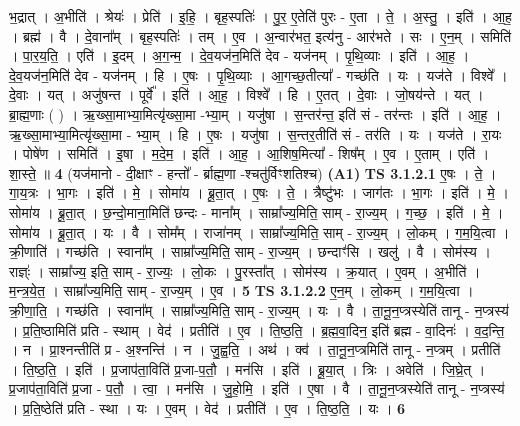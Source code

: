 \documentclass[17pt]{extarticle}
\begin{document}
                  भ॒द्रात् । अ॒भीति॑ । श्रेयः॑ । प्रेति॑ । इ॒हि॒ । बृह॒स्पतिः॑ । पु॒र॒ ए॒तेति॑ पुरः - ए॒ता । ते॒ । अ॒स्तु॒ । इति॑ । आ॒ह॒ । ब्रह्म॑ । वै । दे॒वाना᳚म् । बृह॒स्पतिः॑ । तम् । ए॒व । अ॒न्वार॑भत॒ इत्य॑नु - आर॑भते । सः । ए॒न॒म् । समिति॑ । पा॒र॒य॒ति॒ । एति॑ । इ॒दम् । अ॒ग॒न्म॒ । दे॒व॒यज॑न॒मिति॑ देव - यज॑नम् । पृ॒थि॒व्याः । इति॑ । आ॒ह॒ । दे॒व॒यज॑न॒मिति॑ देव - यज॑नम् । हि । ए॒षः । पृ॒थि॒व्याः । आ॒गच्छ॒तीत्या᳚ - गच्छ॑ति । यः । यज॑ते । विश्वे᳚ । दे॒वाः । यत् । अजु॑षन्त । पूर्वे᳚ । इति॑ । आ॒ह॒ । विश्वे᳚ । हि । ए॒तत् । दे॒वाः । जो॒षय॑न्ते । यत् । ब्रा॒ह्म॒णाः ( ) । ऋ॒ख्सा॒माभ्या॒मित्यृ॑ख्सा॒मा -भ्या॒म् । यजु॑षा । स॒न्तर॑न्त॒ इति॑ सं - तर॑न्तः । इति॑ । आ॒ह॒ । ऋ॒ख्सा॒माभ्या॒मित्यृ॑ख्सा॒मा - भ्या॒म् । हि । ए॒षः । यजु॑षा । स॒न्तर॒तीति॑ सं - तर॑ति । यः । यज॑ते । रा॒यः । पोषे॑ण । समिति॑ । इ॒षा । म॒दे॒म॒ । इति॑ । आ॒ह॒ । आ॒शिष॒मित्या᳚ - शिष᳚म् । ए॒व । ए॒ताम् । एति॑ । शा॒स्ते॒ ॥ \textbf{  4} \newline
                  \newline
                      (यज॑मानो - दी॒क्षाꣳ - हन्तो᳚ - र्ब्राह्म॒णा -श्चतु॑र्विꣳशतिश्च)  \textbf{(A1)} \newline \newline
                                \textbf{ TS 3.1.2.1} \newline
                  ए॒षः । ते॒ । गा॒य॒त्रः । भा॒गः । इति॑ । मे॒ । सोमा॑य । ब्रू॒ता॒त् । ए॒षः । ते॒ । त्रैष्टु॑भः । जाग॑तः । भा॒गः । इति॑ । मे॒ । सोमा॑य । ब्रू॒ता॒त् । छ॒न्दो॒माना॒मिति॑ छन्दः - माना᳚म् । साम्रा᳚ज्य॒मिति॒ साम् - रा॒ज्य॒म् । ग॒च्छ॒ । इति॑ । मे॒ । सोमा॑य । ब्रू॒ता॒त् । यः । वै । सोम᳚म् । राजा॑नम् । साम्रा᳚ज्य॒मिति॒ साम् - रा॒ज्य॒म् । लो॒कम् । ग॒म॒यि॒त्वा । क्री॒णाति॑ । गच्छ॑ति । स्वाना᳚म् । साम्रा᳚ज्य॒मिति॒ साम् - रा॒ज्य॒म् । छन्दाꣳ॑सि । खलु॑ । वै । सोम॑स्य । राज्ञ्ः॑ । साम्रा᳚ज्य॒ इति॒ साम् - रा॒ज्यः॒ । लो॒कः । पु॒रस्ता᳚त् । सोम॑स्य । क्र॒यात् । ए॒वम् । अ॒भीति॑ । म॒न्त्र॒ये॒त॒ । साम्रा᳚ज्य॒मिति॒ साम् - रा॒ज्य॒म् । ए॒व । \textbf{  5} \newline
                  \newline
                                \textbf{ TS 3.1.2.2} \newline
                  ए॒न॒म् । लो॒कम् । ग॒म॒यि॒त्वा । क्री॒णा॒ति॒ । गच्छ॑ति । स्वाना᳚म् । साम्रा᳚ज्य॒मिति॒ साम् - रा॒ज्य॒म् । यः । वै । ता॒नू॒न॒प्त्रस्येति॑ तानू - न॒प्त्रस्य॑ । प्र॒ति॒ष्ठामिति॑ प्रति - स्थाम् । वेद॑ । प्रतीति॑ । ए॒व । ति॒ष्ठ॒ति॒ । ब्र॒ह्म॒वा॒दिन॒ इति॑ ब्रह्म - वा॒दिनः॑ । व॒द॒न्ति॒ । न । प्रा॒श्नन्तीति॑ प्र - अ॒श्नन्ति॑ । न । जु॒ह्व॒ति॒ । अथ॑ । क्व॑ । ता॒नू॒न॒प्त्रमिति॑ तानू - न॒प्त्रम् । प्रतीति॑ । ति॒ष्ठ॒ति॒ । इति॑ । प्र॒जाप॑ता॒विति॑ प्र॒जा-प॒तौ॒ । मन॑सि । इति॑ । ब्रू॒या॒त् । त्रिः । अवेति॑ । जि॒घ्रे॒त् । प्र॒जाप॑ता॒विति॑ प्र॒जा - प॒तौ॒ । त्वा॒ । मन॑सि । जु॒हो॒मि॒ । इति॑ । ए॒षा । वै । ता॒नू॒न॒प्त्रस्येति॑ तानू - न॒प्त्रस्य॑ । प्र॒ति॒ष्ठेति॑ प्रति - स्था । यः । ए॒वम् । वेद॑ । प्रतीति॑ । ए॒व । ति॒ष्ठ॒ति॒ । यः । \textbf{  6} \newline
\end{document}
